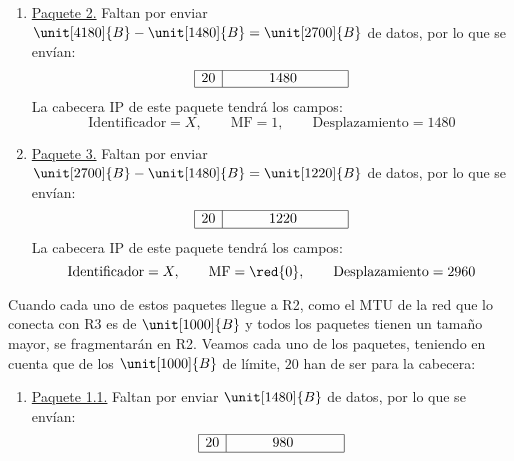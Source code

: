 \begin{ejemplo}
\begin{enumerate}
        \item \ul{Paquete 2.} Faltan por enviar $\unit[4180]{B}-\unit[1480]{B}=\unit[2700]{B}$ de datos, por lo que se envían:
        \begin{equation*}
            \begin{array}{|c|c|}
                \hline 20 & \hspace{1cm} 1480 \hspace{1cm}~\\ \hline
            \end{array}
        \end{equation*}
        La cabecera IP de este paquete tendrá los campos:
        \begin{equation*}
            \text{Identificador} = X,\qquad \text{MF} = 1,\qquad \text{Desplazamiento} = 1480
        \end{equation*}

        \item \ul{Paquete 3.} Faltan por enviar $\unit[2700]{B}-\unit[1480]{B}=\unit[1220]{B}$ de datos, por lo que se envían:
        \begin{equation*}
            \begin{array}{|c|c|}
                \hline 20 & \hspace{1cm} 1220 \hspace{1cm}~\\ \hline
            \end{array}
        \end{equation*}
        La cabecera IP de este paquete tendrá los campos:
        \begin{equation*}
            \text{Identificador} = X,\qquad \text{MF} = \red{0},\qquad \text{Desplazamiento} = 2960
        \end{equation*}
    \end{enumerate}

    Cuando cada uno de estos paquetes llegue a R2, como el \acrshort{MTU} de la red que lo conecta con R3 es de $\unit[1000]{B}$ y todos los paquetes tienen un tamaño mayor, se fragmentarán en R2. Veamos cada uno de los paquetes, teniendo en cuenta que de los $\unit[1000]{B}$ de límite, $20$ han de ser para la cabecera:
    \begin{enumerate}
        \item \ul{Paquete 1.1.} Faltan por enviar $\unit[1480]{B}$ de datos, por lo que se envían:
        \begin{equation*}
            \begin{array}{|c|c|}
                \hline 20 & \hspace{1cm} 980 \hspace{1cm}~\\ \hline
            \end{array}
        \end{equation*}


\end{enumerate}
\end{ejemplo}
